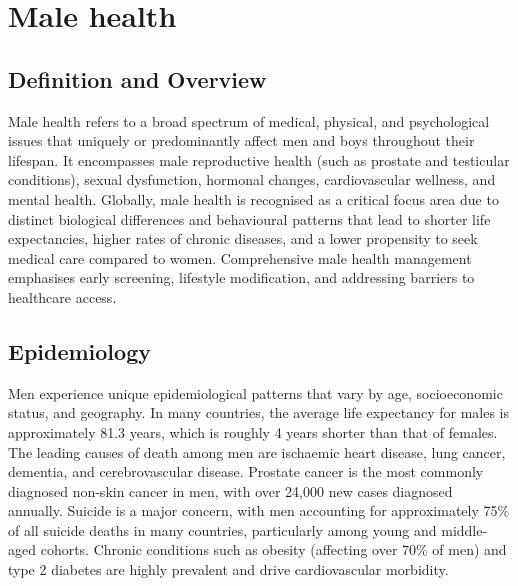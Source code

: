 \chapter{Male health}

\section*{Definition and Overview}
Male health refers to a broad spectrum of medical, physical, and psychological issues that uniquely or predominantly affect men and boys throughout their lifespan. It encompasses male reproductive health (such as prostate and testicular conditions), sexual dysfunction, hormonal changes, cardiovascular wellness, and mental health. Globally, male health is recognised as a critical focus area due to distinct biological differences and behavioural patterns that lead to shorter life expectancies, higher rates of chronic diseases, and a lower propensity to seek medical care compared to women. Comprehensive male health management emphasises early screening, lifestyle modification, and addressing barriers to healthcare access.

\section*{Epidemiology}
Men experience unique epidemiological patterns that vary by age, socioeconomic status, and geography. In many countries, the average life expectancy for males is approximately 81.3 years, which is roughly 4 years shorter than that of females. The leading causes of death among men are ischaemic heart disease, lung cancer, dementia, and cerebrovascular disease. Prostate cancer is the most commonly diagnosed non-skin cancer in men, with over 24,000 new cases diagnosed annually. Suicide is a major concern, with men accounting for approximately 75\% of all suicide deaths in many countries, particularly among young and middle-aged cohorts. Chronic conditions such as obesity (affecting over 70\% of men) and type 2 diabetes are highly prevalent and drive cardiovascular morbidity.

